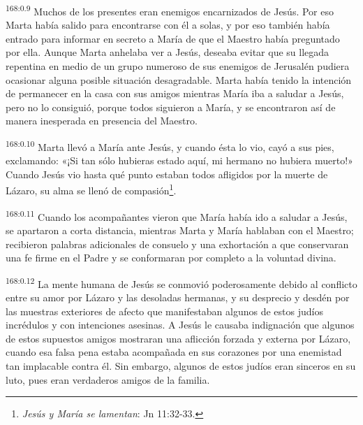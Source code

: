 \par 
\textsuperscript{168:0.9} Muchos de los presentes eran enemigos encarnizados de Jesús. Por eso Marta había salido para encontrarse con él a solas, y por eso también había entrado para informar en secreto a María de que el Maestro había preguntado por ella. Aunque Marta anhelaba ver a Jesús, deseaba evitar que su llegada repentina en medio de un grupo numeroso de sus enemigos de Jerusalén pudiera ocasionar alguna posible situación desagradable. Marta había tenido la intención de permanecer en la casa con sus amigos mientras María iba a saludar a Jesús, pero no lo consiguió, porque todos siguieron a María, y se encontraron así de manera inesperada en presencia del Maestro.

\par 
\textsuperscript{168:0.10} Marta llevó a María ante Jesús, y cuando ésta lo vio, cayó a sus pies, exclamando: «¡Si tan sólo hubieras estado aquí, mi hermano no hubiera muerto!» Cuando Jesús vio hasta qué punto estaban todos afligidos por la muerte de Lázaro, su alma se llenó de compasión\footnote{\textit{Jesús y María se lamentan}: Jn 11:32-33.}.

\par 
\textsuperscript{168:0.11} Cuando los acompañantes vieron que María había ido a saludar a Jesús, se apartaron a corta distancia, mientras Marta y María hablaban con el Maestro; recibieron palabras adicionales de consuelo y una exhortación a que conservaran una fe firme en el Padre y se conformaran por completo a la voluntad divina.

\par 
\textsuperscript{168:0.12} La mente humana de Jesús se conmovió poderosamente debido al conflicto entre su amor por Lázaro y las desoladas hermanas, y su desprecio y desdén por las muestras exteriores de afecto que manifestaban algunos de estos judíos incrédulos y con intenciones asesinas. A Jesús le causaba indignación que algunos de estos supuestos amigos mostraran una aflicción forzada y externa por Lázaro, cuando esa falsa pena estaba acompañada en sus corazones por una enemistad tan implacable contra él. Sin embargo, algunos de estos judíos eran sinceros en su luto, pues eran verdaderos amigos de la familia.


